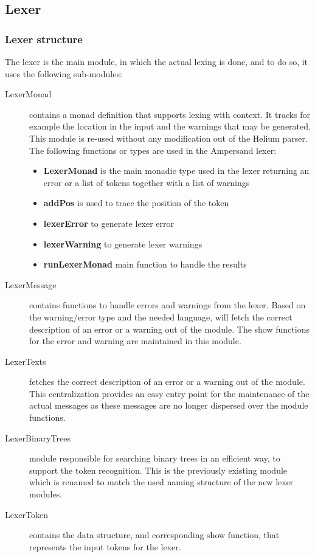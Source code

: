 
\subsection{Lexer}
\label{design:lexer}

\subsubsection{Lexer structure}
The lexer is the main module, in which the actual lexing is done, and to do so, it uses the following sub-modules:

 \begin{description}
 
    \item[LexerMonad] contains a monad definition that supports lexing with context.
      It tracks for example the location in the input and the warnings that may be generated.
	  This module is re-used without any modification out of the  Helium parser.
      The following functions or types are used in the Ampersand lexer:
	  \begin{itemize}
		\item \textbf{LexerMonad} is the main monadic type used in the lexer returning an error or a list of tokens together with a list of warnings
		\item \textbf{addPos} is used to trace the position of the token
		\item \textbf{lexerError} to generate lexer error
		\item \textbf{lexerWarning} to generate lexer warnings
		\item \textbf{runLexerMonad} main function to handle the  results 
	  \end{itemize}
	  
    \item[LexerMessage] contains functions to handle errors and warnings from the lexer.
	  Based on the warning/error type and the needed language,  will fetch the correct description of an error or a warning out of the  module.
	  The show functions for the error and warning are maintained in this module.
	  
    \item[LexerTexts] fetches the correct description of an error or a warning out of the  module.
	  This centralization provides an easy entry point for the maintenance of the actual messages as these messages are no longer dispersed over the module functions.
	  
    \item[LexerBinaryTrees] module responsible for searching binary trees in an efficient way, to support the token recognition.
    This is the previously existing  module which is renamed to match the used naming structure of the new lexer modules.

    \item[LexerToken] contains the data structure, and corresponding show function, that represents the input tokens for the lexer.
	
  \end{description}


